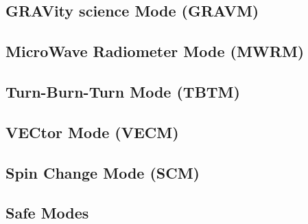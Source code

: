 \subsection{GRAVity science Mode (GRAVM)}
\label{subsec:grav_mode}

\subsection{MicroWave Radiometer Mode (MWRM)}
\label{subsec:mwr_mode}

\subsection{Turn-Burn-Turn Mode (TBTM)}
\label{subsec:tbt_mode}

\subsection{VECtor Mode (VECM)}
\label{subsec:vec_mode}

\subsection{Spin Change Mode (SCM)}
\label{subsec:spin_change_mode}

\subsection{Safe Modes}
\label{subsec:safe_modes}